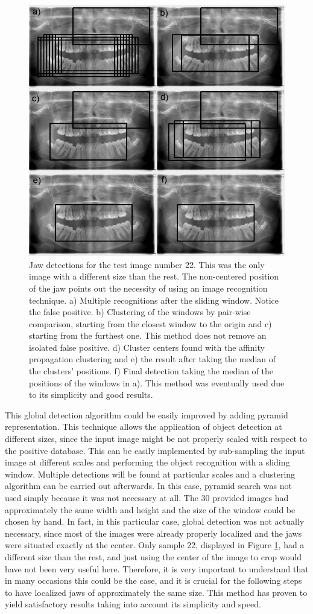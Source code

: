 \documentclass[a4paper,11pt,twoside]{article}
\begin{document}
\begin{figure}
\centering
\includegraphics[width=0.75\columnwidth]{jawDetections.jpg}
\caption{Jaw detections for the test image number 22. This was the only image with a different size than the rest. The non-centered position of the jaw points out the necessity of using an image recognition technique. a) Multiple recognitions after the sliding window. Notice the false positive. b) Clustering of the windows by pair-wise comparison, starting from the closest window to the origin and c) starting from the furthest one. This method does not remove an isolated false positive. d) Cluster centers found with the affinity propagation clustering and e) the result after taking the median of the clusters' positions. f) Final detection taking the median of the positions of the windows in a). This method was eventually used due to its simplicity and good results.}
\label{jawDetections}
\end{figure}

This global detection algorithm could be easily improved by adding pyramid representation. This technique allows the application of object detection at different sizes, since the input image might be not properly scaled with respect to the positive database. This can be easily implemented by sub-sampling the input image at different scales and performing the object recognition with a sliding window. Multiple detections will be found at particular scales and a clustering algorithm can be carried out afterwards. In this case, pyramid search was not used simply because it was not necessary at all. The 30 provided images had approximately the same width and height and the size of the window could be chosen by hand. In fact, in this particular case, global detection was not actually necessary, since most of the images were already properly localized and the jaws were situated exactly at the center. Only sample 22, displayed in Figure \ref{jawDetections}, had a different size than the rest, and just using the center of the image to crop would have not been very useful here. Therefore, it is very important to understand that in many occasions this could be the case, and it is crucial for the following steps to have localized jaws of approximately the same size. This method has proven to yield satisfactory results taking into account its simplicity and speed.
\end{document}
